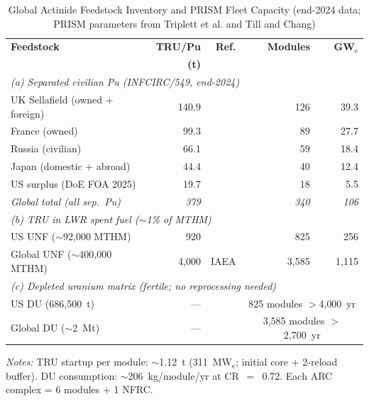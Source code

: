 \documentclass[10pt,twoside]{article}
\begin{document}
\begin{table}[t]
\centering
\small
\caption{Global Actinide Feedstock Inventory and PRISM Fleet Capacity
(end-2024 data; PRISM parameters from Triplett et al.\cite{Triplett2012}
and Till and Chang\cite{Till2011})}
\label{tab:feedstock}
\setlength{\tabcolsep}{4pt}
\begin{tabular}{p{5.6cm}rrr r}
\hline
\textbf{Feedstock} & \textbf{TRU/Pu} & \textbf{Ref.} &
\textbf{Modules} & \textbf{GW$_\text{e}$} \\
 & \textbf{(t)} & & & \\
\hline
\multicolumn{5}{l}{\textit{(a) Separated civilian Pu (INFCIRC/549, end-2024)}} \\
\quad UK Sellafield (owned + foreign)   & 140.9 & \cite{IPFM2024} & 126 & 39.3 \\
\quad France (owned)                    &  99.3 & \cite{IPFM2024} &  89 & 27.7 \\
\quad Russia (civilian)                 &  66.1 & \cite{IPFM2024} &  59 & 18.4 \\
\quad Japan (domestic + abroad)         &  44.4 & \cite{IPFM2024} &  40 & 12.4 \\
\quad US surplus (DoE FOA 2025)         &  19.7 & \cite{DOE_Pu_FOA_2025} & 18 & 5.5 \\
\quad \textit{Global total (all sep.\ Pu)} & \textit{379} & \cite{IPFM2024} &
  \textit{340} & \textit{106} \\
\hline
\multicolumn{5}{l}{\textit{(b) TRU in LWR spent fuel ($\sim$1\% of MTHM)}} \\
\quad US UNF ($\sim$92{,}000 MTHM)     &  920 & \cite{PNNL33938} & 825 & 256 \\
\quad Global UNF ($\sim$400{,}000 MTHM)& 4{,}000 & IAEA & 3{,}585 & 1{,}115 \\
\hline
\multicolumn{5}{l}{\textit{(c) Depleted uranium matrix (fertile; no reprocessing needed)}} \\
\quad US DU (686{,}500~t) & --- & \cite{WNA_US_FC} &
  \multicolumn{2}{c}{825 modules $>$4{,}000~yr} \\
\quad Global DU ($\sim$2~Mt) & --- & \cite{WNA_Supply} &
  \multicolumn{2}{c}{3{,}585 modules $>$2{,}700~yr} \\
\hline
\end{tabular}
\vspace{2pt}
\par\noindent\footnotesize
\textit{Notes:} TRU startup per module: $\sim$1.12~t (311~MW$_\text{e}$;
initial core + 2-reload buffer). DU consumption: $\sim$206~kg/module/yr
at CR~$=$~0.72. Each ARC complex = 6 modules + 1 NFRC.
\end{table}
\end{document}
